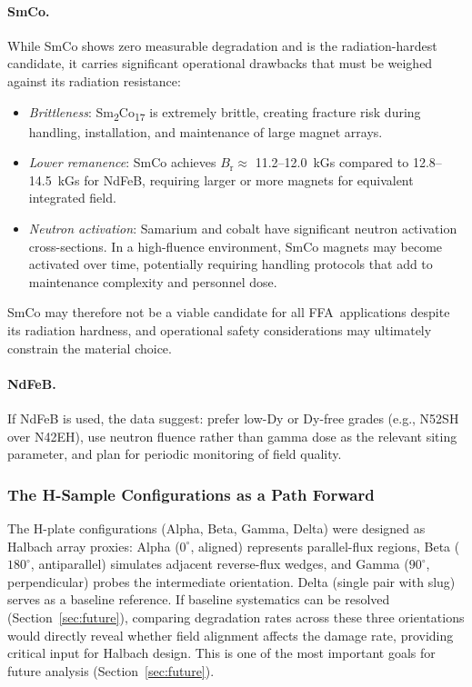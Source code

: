 \documentclass[11pt,letterpaper]{article}
\newcommand{\SmCo}{Sm\textsubscript{2}Co\textsubscript{17}}
\newcommand{\Br}{B_\mathrm{r}}
\newcommand{\FFA}{FFA}
\begin{document}
\paragraph{SmCo.} While SmCo shows zero measurable degradation and is the
radiation-hardest candidate, it carries significant operational drawbacks
that must be weighed against its radiation resistance:
\begin{itemize}
    \item \emph{Brittleness}: \SmCo{} is extremely brittle, creating
    fracture risk during handling, installation, and maintenance of large
    magnet arrays.
    \item \emph{Lower remanence}: SmCo achieves $\Br \approx$
    11.2--\SI{12.0}{kGs} compared to 12.8--\SI{14.5}{kGs} for NdFeB,
    requiring larger or more magnets for equivalent integrated field.
    \item \emph{Neutron activation}: Samarium and cobalt have significant
    neutron activation cross-sections. In a high-fluence environment, SmCo
    magnets may become activated over time, potentially requiring handling
    protocols that add to maintenance complexity and personnel dose.
\end{itemize}
SmCo may therefore not be a viable candidate for all \FFA~applications
despite its radiation hardness, and operational safety considerations
may ultimately constrain the material choice.

\paragraph{NdFeB.} If NdFeB is used, the data suggest: prefer low-Dy or
Dy-free grades (e.g., N52SH over N42EH), use neutron fluence rather than
gamma dose as the relevant siting parameter, and plan for periodic
monitoring of field quality.

\subsubsection{The H-Sample Configurations as a Path Forward}

The H-plate configurations (Alpha, Beta, Gamma, Delta) were designed as
Halbach array proxies: Alpha ($0^\circ$, aligned) represents parallel-flux
regions, Beta ($180^\circ$, antiparallel) simulates adjacent reverse-flux
wedges, and Gamma ($90^\circ$, perpendicular) probes the intermediate
orientation. Delta (single pair with slug) serves as a baseline reference.
If baseline systematics can be resolved (Section~\ref{sec:future}),
comparing degradation rates across these three orientations would directly
reveal whether field alignment affects the damage rate, providing critical
input for Halbach design. This is one of the most important goals for
future analysis (Section~\ref{sec:future}).
\end{document}
